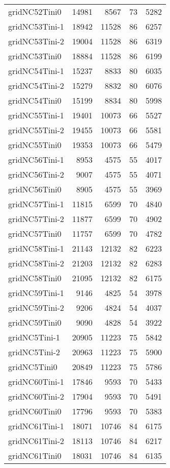 \begin{longtable}{lrrrr}
gridNC52Tini0 & 14981 & 8567 & 73 & 5282 \\
gridNC53Tini-1 & 18942 & 11528 & 86 & 6257 \\
gridNC53Tini-2 & 19004 & 11528 & 86 & 6319 \\
gridNC53Tini0 & 18884 & 11528 & 86 & 6199 \\
gridNC54Tini-1 & 15237 & 8833 & 80 & 6035 \\
gridNC54Tini-2 & 15279 & 8832 & 80 & 6076 \\
gridNC54Tini0 & 15199 & 8834 & 80 & 5998 \\
gridNC55Tini-1 & 19401 & 10073 & 66 & 5527 \\
gridNC55Tini-2 & 19455 & 10073 & 66 & 5581 \\
gridNC55Tini0 & 19353 & 10073 & 66 & 5479 \\
gridNC56Tini-1 & 8953 & 4575 & 55 & 4017 \\
gridNC56Tini-2 & 9007 & 4575 & 55 & 4071 \\
gridNC56Tini0 & 8905 & 4575 & 55 & 3969 \\
gridNC57Tini-1 & 11815 & 6599 & 70 & 4840 \\
gridNC57Tini-2 & 11877 & 6599 & 70 & 4902 \\
gridNC57Tini0 & 11757 & 6599 & 70 & 4782 \\
gridNC58Tini-1 & 21143 & 12132 & 82 & 6223 \\
gridNC58Tini-2 & 21203 & 12132 & 82 & 6283 \\
gridNC58Tini0 & 21095 & 12132 & 82 & 6175 \\
gridNC59Tini-1 & 9146 & 4825 & 54 & 3978 \\
gridNC59Tini-2 & 9206 & 4824 & 54 & 4037 \\
gridNC59Tini0 & 9090 & 4828 & 54 & 3922 \\
gridNC5Tini-1 & 20905 & 11223 & 75 & 5842 \\
gridNC5Tini-2 & 20963 & 11223 & 75 & 5900 \\
gridNC5Tini0 & 20849 & 11223 & 75 & 5786 \\
gridNC60Tini-1 & 17846 & 9593 & 70 & 5433 \\
gridNC60Tini-2 & 17904 & 9593 & 70 & 5491 \\
gridNC60Tini0 & 17796 & 9593 & 70 & 5383 \\
gridNC61Tini-1 & 18071 & 10746 & 84 & 6175 \\
gridNC61Tini-2 & 18113 & 10746 & 84 & 6217 \\
gridNC61Tini0 & 18031 & 10746 & 84 & 6135 \\

\end{longtable}
